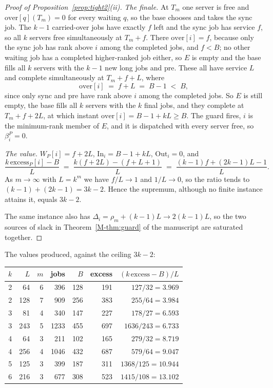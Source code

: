 \documentclass[mathematics,supfile,submit,moreauthors]{Definitions/mdpi}
\begin{document}
\begin{proof}[Proof of Proposition~\ref{prop:tight2}(ii)]
\emph{The finale.} At $T_m$ one server is free and $\mathrm{over}[q](T_m) = 0$
for every waiting $q$, so the base chooses and takes the sync job. The $k-1$
carried-over jobs have exactly $f$ left and the sync job has service $f$, so all
$k$ servers free simultaneously at $T_m + f$. There $\mathrm{over}[i] = f$,
because only the sync job has rank above $i$ among the completed jobs, and
$f < B$; no other waiting job has a completed higher-ranked job either, so $E$ is
empty and the base fills all $k$ servers with the $k-1$ new long jobs and pre.
These all have service $L$ and complete simultaneously at $T_m + f + L$, where
\[
  \mathrm{over}[i] \;=\; f + L \;=\; B - 1 \;<\; B ,
\]
since only sync and pre have rank above $i$ among the completed jobs. So $E$ is
still empty, the base fills all $k$ servers with the $k$ final jobs, and they
complete at $T_m + f + 2L$, at which instant
$\mathrm{over}[i] = B - 1 + kL \ge B$. The guard fires, $i$ is the minimum-rank
member of $E$, and it is dispatched with every server free, so $\beta^P_i = 0$.

\emph{The value.} $W_P[i] = f + 2L$, $\mathrm{In}_i = B - 1 + kL$,
$\mathrm{Out}_i = 0$, and
\[
  \frac{k\,\mathrm{excess}_P[i] - B}{L}
  \;=\; \frac{k(f + 2L) - (f + L + 1)}{L}
  \;=\; \frac{(k-1)f + (2k-1)L - 1}{L} .
\]
As $m \to \infty$ with $L = k^m$ we have $f/L \to 1$ and $1/L \to 0$, so the
ratio tends to $(k-1) + (2k-1) = 3k-2$. Hence the supremum, although no finite
instance attains it, equals $3k-2$.

The same instance also has $\Delta_i = \rho_m + (k-1)L \to 2(k-1)L$, so the two
sources of slack in Theorem~\ref*{M-thm:guard} of the manuscript are saturated together.
\end{proof}

The values produced, against the ceiling $3k-2$:

\begin{center}
\begin{tabular}{rrrrrrr}
\hline
$k$ & $L$ & $m$ & jobs & $B$ & excess & $(k\,\mathrm{excess}-B)/L$ \\
\hline
2 & 64 & 6 & 396 & 128 & 191 & $127/32 = 3.969$ \\
2 & 128 & 7 & 909 & 256 & 383 & $255/64 = 3.984$ \\
3 & 81 & 4 & 340 & 147 & 227 & $178/27 = 6.593$ \\
3 & 243 & 5 & 1233 & 455 & 697 & $1636/243 = 6.733$ \\
4 & 64 & 3 & 211 & 102 & 165 & $279/32 = 8.719$ \\
4 & 256 & 4 & 1046 & 432 & 687 & $579/64 = 9.047$ \\
5 & 125 & 3 & 399 & 187 & 311 & $1368/125 = 10.944$ \\
6 & 216 & 3 & 677 & 308 & 523 & $1415/108 = 13.102$ \\
\hline
\end{tabular}
\end{center}
\end{document}
